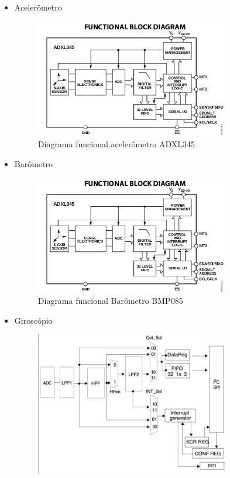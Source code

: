 \begin{itemize}
  \item Acelerômetro
  \begin{figure}[H]
    \centering
    \includegraphics[width=0.8\textwidth]{figuras/2}
    \caption[Diagrama funcional acelerômetro ADXL345]{Diagrama funcional acelerômetro ADXL345~\cite{acelerometro}}
    \label{img:acelerometro}
  \end{figure}
  \item Barômetro
  \begin{figure}[H]
    \centering
    \includegraphics[width=0.8\textwidth]{figuras/2}
    \caption[Diagrama funcional Barômetro BMP085]{Diagrama funcional Barômetro BMP085~\cite{barometro}}
    \label{img:barometro}
  \end{figure}
  \item Giroscópio
  \begin{figure}[H]
    \centering
    \includegraphics[width=0.8\textwidth]{figuras/4}

\end{figure}
\end{itemize}
